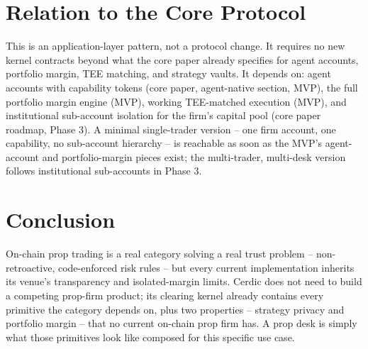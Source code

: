 \documentclass[11pt,a4paper]{article}
\begin{document}
\section{Relation to the Core Protocol}
\label{sec:relation}

This is an application-layer pattern, not a protocol change. It requires no new kernel
contracts beyond what the core paper already specifies for agent accounts, portfolio
margin, TEE matching, and strategy vaults. It depends on: agent accounts with capability
tokens (core paper, agent-native section, MVP), the full portfolio margin engine (MVP),
working TEE-matched execution (MVP), and institutional sub-account isolation for the firm's
capital pool (core paper roadmap, Phase 3). A minimal single-trader version -- one firm
account, one capability, no sub-account hierarchy -- is reachable as soon as the MVP's
agent-account and portfolio-margin pieces exist; the multi-trader, multi-desk version
follows institutional sub-accounts in Phase 3.

\section{Conclusion}
\label{sec:conclusion}

On-chain prop trading is a real category solving a real trust problem -- non-retroactive,
code-enforced risk rules -- but every current implementation inherits its venue's
transparency and isolated-margin limits. Cerdic does not need to build a competing
prop-firm product; its clearing kernel already contains every primitive the category
depends on, plus two properties -- strategy privacy and portfolio margin -- that no current
on-chain prop firm has. A prop desk is simply what those primitives look like composed for
this specific use case.
\end{document}

